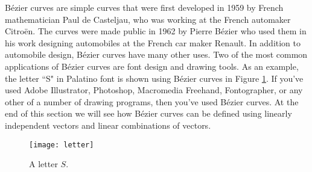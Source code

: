  \label{chap:independence}

\vspace*{-17 pt}

\vspace*{13 pt}

\label{sec:appl_bezier}

B\'{e}zier curves are simple curves that were first developed in 1959 by French mathematician Paul de Casteljau, who was working at the French automaker Citro\"{e}n. The curves were made public in 1962 by Pierre B\'{e}zier who used them in his work designing automobiles at the French car maker Renault. In addition to automobile design, B\'{e}zier curves have many other uses. Two of the most common applications of B\'{e}zier curves are font design and drawing tools. As an example, the letter ``S" in Palatino font is shown using B\'{e}zier curves in Figure \ref{F:Letter_S}. If you've used Adobe Illustrator, Photoshop, Macromedia Freehand, Fontographer, or any other of a number of drawing programs, then you've used B\'{e}zier curves. At the end of this section we will see how B\'{e}zier curves can be defined using linearly independent vectors and linear combinations of vectors.  
\begin{figure}[ht] \centering
\texttt{[image: letter]}
\caption{A letter $S$.}
\label{F:Letter_S}
\end{figure}


